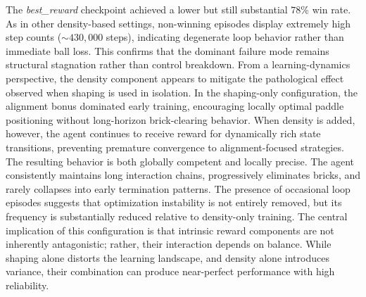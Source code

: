 \documentclass[12pt,a4paper]{report}
\begin{document}
The \textit{best\_reward} checkpoint achieved a lower but still substantial $78$\% win rate. As in other density-based settings, non-winning episodes display extremely high step counts 
(${\sim}430{,}000$ steps), indicating degenerate loop behavior rather than immediate ball loss. This confirms that the dominant failure mode remains structural stagnation rather than control breakdown.
From a learning-dynamics perspective, the density component appears to mitigate the pathological effect observed when shaping is used in isolation. In the shaping-only configuration, the alignment bonus dominated early training, encouraging locally optimal paddle positioning without long-horizon brick-clearing behavior. When density is added, however, the agent continues to receive reward for dynamically rich state transitions, preventing premature convergence to alignment-focused strategies. 
The resulting behavior is both globally competent and locally precise. The agent consistently maintains long interaction chains, progressively eliminates bricks, and rarely collapses into early termination patterns. The presence of occasional loop episodes suggests that optimization instability is not entirely removed, but its frequency is substantially reduced relative to density-only training.
The central implication of this configuration is that intrinsic reward components are not inherently antagonistic; rather, their interaction depends on balance. While shaping alone distorts the learning landscape, and density alone introduces variance, their combination can produce near-perfect performance with high reliability.
\end{document}
